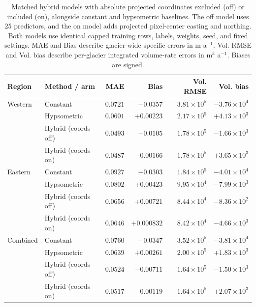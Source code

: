 \begin{table}[!htbp]
\centering\small
\setlength{\tabcolsep}{5pt}
\caption{Matched hybrid models with absolute projected coordinates excluded (off) or included (on), alongside constant and hypsometric baselines. The off model uses 25 predictors, and the on model adds projected pixel-center easting and northing. Both models use identical capped training rows, labels, weights, seed, and fixed settings. MAE and Bias describe glacier-wide specific errors in m a$^{-1}$. Vol. RMSE and Vol. bias describe per-glacier integrated volume-rate errors in m$^3$ a$^{-1}$. Biases are signed.}
\label{tab:coordinates}
\begin{tabular}{llrrrr}
\toprule
Region & Method / arm & MAE & Bias & Vol. RMSE & Vol. bias \\
\midrule
Western & Constant & $0.0721$ & $-0.0357$ & $3.81\times10^{5}$ & $-3.76\times10^{4}$ \\
 & Hypsometric & $0.0601$ & $+0.00223$ & $2.17\times10^{5}$ & $+4.13\times10^{3}$ \\
 & Hybrid (coords off) & $0.0493$ & $-0.0105$ & $1.78\times10^{5}$ & {\boldmath$-1.66\times10^{3}$} \\
 & Hybrid (coords on) & {\boldmath$0.0487$} & {\boldmath$-0.00166$} & {\boldmath$1.78\times10^{5}$} & $+3.65\times10^{3}$ \\
\midrule
Eastern & Constant & $0.0927$ & $-0.0303$ & $1.84\times10^{5}$ & $-4.01\times10^{4}$ \\
 & Hypsometric & $0.0802$ & $+0.00423$ & $9.95\times10^{4}$ & $-7.99\times10^{3}$ \\
 & Hybrid (coords off) & $0.0656$ & $+0.00721$ & $8.44\times10^{4}$ & {\boldmath$-8.36\times10^{2}$} \\
 & Hybrid (coords on) & {\boldmath$0.0646$} & {\boldmath$+0.000832$} & {\boldmath$8.42\times10^{4}$} & $-4.66\times10^{3}$ \\
\midrule
Combined & Constant & $0.0760$ & $-0.0347$ & $3.52\times10^{5}$ & $-3.81\times10^{4}$ \\
 & Hypsometric & $0.0639$ & $+0.00261$ & $2.00\times10^{5}$ & $+1.83\times10^{3}$ \\
 & Hybrid (coords off) & $0.0524$ & $-0.00711$ & $1.64\times10^{5}$ & {\boldmath$-1.50\times10^{3}$} \\
 & Hybrid (coords on) & {\boldmath$0.0517$} & {\boldmath$-0.00119$} & {\boldmath$1.64\times10^{5}$} & $+2.07\times10^{3}$ \\
\bottomrule
\end{tabular}
\end{table}

